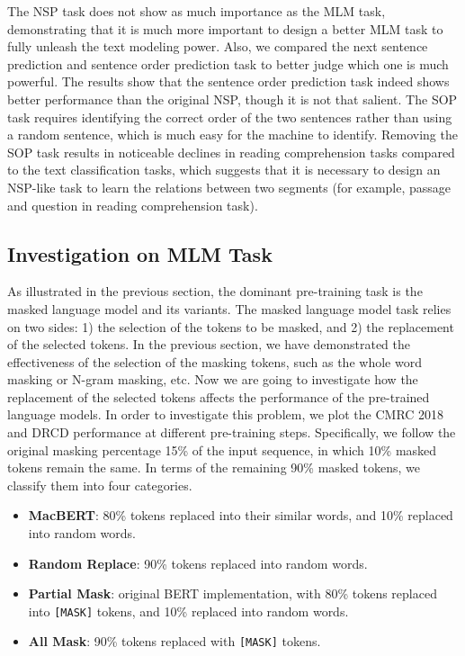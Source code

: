 \documentclass[journal]{IEEEtran}
\begin{document}
\begin{CJK*}{UTF8}{gbsn}
The NSP task does not show as much importance as the MLM task, demonstrating that it is much more important to design a better MLM task to fully unleash the text modeling power.
Also, we compared the next sentence prediction \cite{devlin-etal-2019-bert} and sentence order prediction \cite{lan2019albert} task to better judge which one is much powerful.
The results show that the sentence order prediction task indeed shows better performance than the original NSP, though it is not that salient.
The SOP task requires identifying the correct order of the two sentences rather than using a random sentence, which is much easy for the machine to identify. 
Removing the SOP task results in noticeable declines in reading comprehension tasks compared to the text classification tasks, which suggests that it is necessary to design an NSP-like task to learn the relations between two segments (for example, passage and question in reading comprehension task).


\subsection{Investigation on MLM Task}
As illustrated in the previous section, the dominant pre-training task is the masked language model and its variants.
The masked language model task relies on two sides: 1) the selection of the tokens to be masked, and 2) the replacement of the selected tokens.
In the previous section, we have demonstrated the effectiveness of the selection of the masking tokens, such as the whole word masking or N-gram masking, etc.
Now we are going to investigate how the replacement of the selected tokens affects the performance of the pre-trained language models.
In order to investigate this problem, we plot the CMRC 2018 and DRCD performance at different pre-training steps.
Specifically, we follow the original masking percentage 15\% of the input sequence, in which 10\% masked tokens remain the same.
In terms of the remaining 90\% masked tokens, we classify them into four categories.
\begin{itemize}
	\item {\bf MacBERT}: 80\% tokens replaced into their similar words, and 10\% replaced into random words. 
	\item {\bf Random Replace}: 90\% tokens replaced into random words.
	\item {\bf Partial Mask}: original BERT implementation, with 80\% tokens replaced into {\tt [MASK]} tokens, and 10\% replaced into random words.	
	\item {\bf All Mask}: 90\% tokens replaced with {\tt [MASK]} tokens.
\end{itemize}
  

\end{CJK*}
\end{document}
